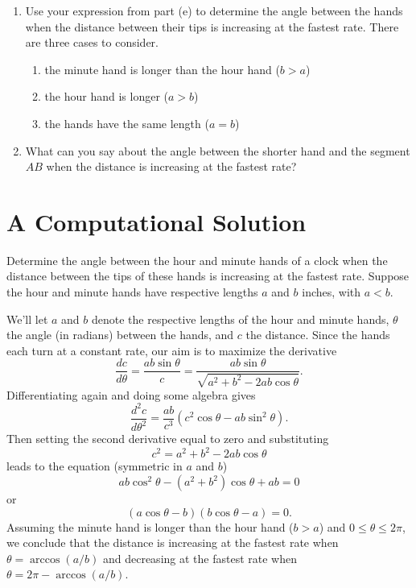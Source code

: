 \documentclass{ximera}
\begin{document}
\begin{question}
\begin{enumerate}
\item Use your expression from part (e) to determine the angle between the hands when the distance between their tips is increasing at the fastest rate. There are three cases to consider.

\begin{enumerate}
\item the minute hand is longer than the hour hand ($b>a$)

\item the hour hand is longer ($a>b$)

\item the hands have the same length ($a=b$)
\end{enumerate}

\item What can you say about the angle between the shorter hand and the segment $AB$ when the distance is increasing at the fastest rate? 

\end{enumerate}

\end{question}

\section*{A Computational Solution}

\begin{question} \label{Q9dgDDGHGMMMB}
Determine the angle between the hour and minute hands of a clock when the distance between the tips of these hands is increasing at the fastest rate. Suppose the hour and minute hands have respective lengths $a$ and $b$ inches, with $a<b$. 

\begin{explanation}
We'll let $a$ and $b$ denote the respective lengths of the hour and minute hands, $\theta$ the angle (in radians) between the hands, and $c$ the distance. Since the hands each turn at a constant rate, our aim is to maximize the derivative
\[
        \frac{dc}{d\theta} = \frac{ab\sin \theta}{c} = \frac{ab \sin \theta}{\sqrt{a^2+b^2-2ab\cos\theta}}.
\]
Differentiating again and doing some algebra gives
\[
       \frac{d^2c}{d\theta^2} = \frac{ab}{c^3} \left( c^2\cos\theta - ab\sin^2\theta  \right).
\]
Then setting the second derivative equal to zero and substituting 
\[
      c^2 = a^2+b^2-2ab\cos\theta
\]
leads to the equation (symmetric in $a$ and $b$)
\[
     ab \cos^2\theta - (a^2 + b^2)\cos\theta + ab = 0
\]
or
\[
              (a \cos \theta - b) (b \cos \theta - a) = 0 .
\]
Assuming the minute hand is longer than the hour hand ($b>a$) and $0\leq \theta \leq 2\pi$, we conclude that the distance is increasing at the fastest rate when $\theta = \arccos(a/b)$ and decreasing at the fastest rate when $\theta  = 2\pi - \arccos(a/b)$.

\end{explanation}
\end{question}
\end{document}
